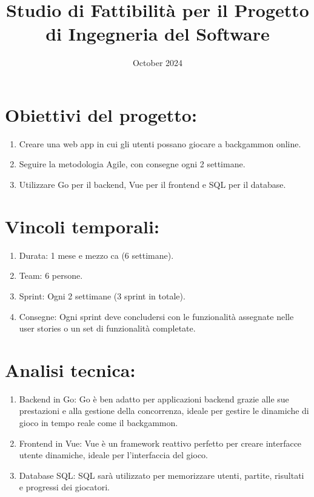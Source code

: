 \documentclass{article}
\title{Studio di Fattibilità per il Progetto di Ingegneria del Software}
\date{October 2024}
\begin{document}
\maketitle

\section{Obiettivi del progetto:}

\begin{enumerate}
    \item    Creare una web app in cui gli utenti possano giocare a backgammon online.
    \item    Seguire la metodologia Agile, con consegne ogni 2 settimane.
    \item    Utilizzare Go per il backend, Vue per il frontend e SQL per il database.
\end{enumerate}

\section{Vincoli temporali:}

\begin{enumerate}
    \item   Durata: 1 mese e mezzo ca (6 settimane).
    \item   Team: 6 persone.
    \item   Sprint: Ogni 2 settimane (3 sprint in totale).
    \item   Consegne: Ogni sprint deve concludersi con le funzionalità assegnate nelle user stories o un set di funzionalità completate.
\end{enumerate}

\section{Analisi tecnica:}

\begin{enumerate}
    \item Backend in Go: Go è ben adatto per applicazioni backend grazie alle sue prestazioni e alla gestione della concorrenza, ideale per gestire le dinamiche di gioco in tempo reale come il backgammon.
    \item Frontend in Vue: Vue è un framework reattivo perfetto per creare interfacce utente dinamiche, ideale per l'interfaccia del gioco.
    \item Database SQL: SQL sarà utilizzato per memorizzare utenti, partite, risultati e progressi dei giocatori.
\end{enumerate}
\end{document}
